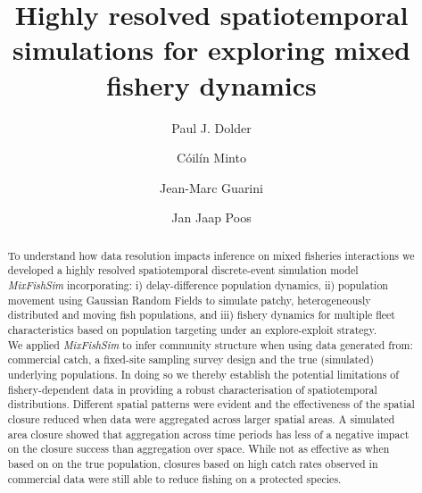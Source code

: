 \documentclass[preprint]{elsarticle}
\begin{document}
\begin{frontmatter}
\title{Highly resolved spatiotemporal simulations for
	exploring mixed fishery dynamics}

\author[1,2]{Paul J. Dolder}

\author[1]{Cóilín Minto}
\author[3]{Jean-Marc Guarini}
\author[4,5]{Jan Jaap Poos}

\address[1]{Marine and Freshwater Research Centre, Galway-Mayo Institute of
	Technology (GMIT), Dublin Road, Galway, Ireland} 
\address[2]{Centre for Environment, Fisheries and Aquaculture Science (Cefas),
	Pakefield Road, Lowestoft, UK}
\address[3]{Sorbonne Université, Faculty of Sciences, 4 Place Jussieu, 75005
	Paris, France}
\address[4]{Wageningen Marine Research, Haringkade 1 1976 CP IJmuiden,
	Netherlands}
\address[5]{Aquaculture and Fisheries Group, Wageningen University \& Research,
	Zodiac Building 122, De Elst 1, 6708 WD Wageningen, the Netherlands}

\begin{abstract}

To understand how data resolution impacts inference on mixed fisheries
interactions we developed a highly resolved spatiotemporal discrete-event
simulation model \emph{MixFishSim} incorporating: i) delay-difference
population dynamics, ii) population movement using Gaussian Random Fields to
simulate patchy, heterogeneously distributed and moving fish populations, and
iii) fishery dynamics for multiple fleet characteristics based on population
targeting under an explore-exploit strategy. \\ 

We applied \emph{MixFishSim} to infer community structure when using data
generated from: commercial catch, a fixed-site sampling survey design and the
true (simulated) underlying populations. In doing so we thereby establish the
potential limitations of fishery-dependent data in providing a robust
characterisation of spatiotemporal distributions. Different spatial patterns
were evident and the effectiveness of the spatial closure reduced when data
were aggregated across larger spatial areas. A simulated area closure showed
that aggregation across time periods has less of a negative impact on the
closure success than aggregation over space. While not as effective as when
based on on the true population, closures based on high catch rates observed in
commercial data were still able to reduce fishing on a protected species. \\ 


\end{abstract}
\end{frontmatter}
\end{document}
